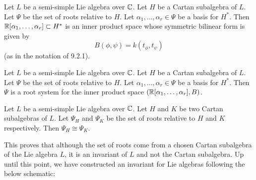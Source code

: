 \documentclass[a4paper]{article}
\begin{document}
\begin{prp}{}{} Let $L$ be a semi-simple Lie algebra over $\mathbb{C}$. Let $H$ be a Cartan subalgebra of $L$. Let $\Psi$ be the set of roots relative to $H$. Let $\alpha_1,\dots,\alpha_r\in\Psi$ be a basis for $H^\ast$. Then $\mathbb{R}[\alpha_1,\dots,\alpha_r]\subset H^\ast$ is an inner product space whose symmetric bilinear form is given by $$B(\phi,\psi)= k(t_\phi,t_\psi)$$ (as in the notation of 9.2.1). 
\end{prp}

\begin{prp}{}{} Let $L$ be a semi-simple Lie algebra over $\mathbb{C}$. Let $H$ be a Cartan subalgebra of $L$. Let $\Psi$ be the set of roots relative to $H$. Let $\alpha_1,\dots,\alpha_r\in\Psi$ be a basis for $H^\ast$. Then $\Psi$ is a root system for the inner product space $(\mathbb{R}[\alpha_1,\dots,\alpha_r],B)$. 
\end{prp}

\begin{prp}{}{} Let $L$ be a semi-simple Lie algebra over $\mathbb{C}$. Let $H$ and $K$ be two Cartan subalgebras of $L$. Let $\Psi_H$ and $\Psi_K$ be the set of roots relative to $H$ and $K$ respectively. Then $\Psi_H\cong\Psi_K$. 
\end{prp}

This proves that although the set of roots come from a chosen Cartan subalgebra of the Lie algebra $L$, it is an invariant of $L$ and not the Cartan subalgebra. Up until this point, we have constructed an invariant for Lie algebras following the below schematic: \\~\\
 \\
\end{document}
